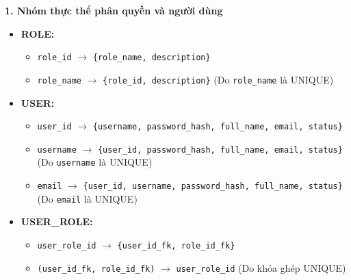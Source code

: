 {\small
\textbf{1. Nhóm thực thể phân quyền và người dùng}
\begin{itemize}
    \item \textbf{ROLE:}
    \begin{itemize}
        \item \texttt{role\_id} $\rightarrow$ \texttt{\{role\_name, description\}}
        \item \texttt{role\_name} $\rightarrow$ \texttt{\{role\_id, description\}} (Do \texttt{role\_name} là UNIQUE)
    \end{itemize}
    \item \textbf{USER:}
    \begin{itemize}
        \item \texttt{user\_id} $\rightarrow$ \texttt{\{username, password\_hash, full\_name, email, status\}}
        \item \texttt{username} $\rightarrow$ \texttt{\{user\_id, password\_hash, full\_name, email, status\}} (Do \texttt{username} là UNIQUE)
        \item \texttt{email} $\rightarrow$ \texttt{\{user\_id, username, password\_hash, full\_name, status\}} (Do \texttt{email} là UNIQUE)
    \end{itemize}
    \item \textbf{USER\_ROLE:}
    \begin{itemize}
        \item \texttt{user\_role\_id} $\rightarrow$ \texttt{\{user\_id\_fk, role\_id\_fk\}}
        \item \texttt{(user\_id\_fk, role\_id\_fk)} $\rightarrow$ \texttt{user\_role\_id} (Do khóa ghép UNIQUE)
    \end{itemize}
\end{itemize}

}
